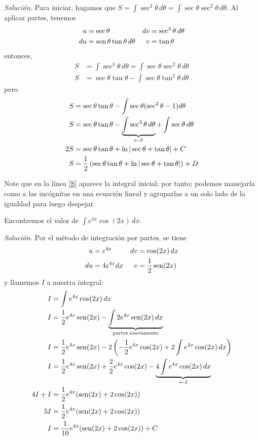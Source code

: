 \enlargethispage*{\baselineskip}

\emph{Solución.} Para iniciar, hagamos que $S=\int \sec ^{3}\theta\,d\theta=\int \sec\theta \sec^{2}\theta\,d\theta$. Al aplicar partes, tenemos
\begin{align*}
u&=\sec \theta & dv&=\sec ^{2}\theta\,d\theta\\
du&=\operatorname{sen} \theta \tan \theta\,d\theta & v&=\tan \theta
\end{align*}
entonces,
\begin{align*}
S&=\int \sec ^{3}\theta\,d\theta=\int \sec\theta \sec^{2}\theta\,d\theta\\
S&=\sec \theta \tan \theta -\int \sec \theta \tan ^{2}\theta\,d\theta
\end{align*}
pero
\begin{align}\label{S}
S&=\sec \theta \tan \theta -\int \sec \theta (\sec ^{2}\theta -1)d\theta\notag\\
S&=\sec \theta \tan \theta -\underbrace{\int \sec ^{3}\theta\,d\theta }_{\leftarrow S}+\int\sec \theta\,d\theta\\
2S&=\sec \theta \tan \theta +\ln |\sec \theta +\tan \theta |+C\notag\\
S&=\frac{1}{2}\left(\sec \theta \tan \theta +\ln |\sec \theta +\tan \theta |\right)+D\notag
\end{align}

Note que en la línea \eqref{S} aparece la integral inicial; por tanto; podemos manejarla como a las incógnitas en una ecuación lineal y agruparlas a un solo lado de la igualdad para luego despejar.

\begin{ejemplo}
Encontremos el valor de $\int e^{4x}\cos (2x)\,dx$.
\end{ejemplo}

\emph{Solución.} Por el método de integración por partes, se tiene
\begin{align*}
u&=e^{4x} & dv&=\cos (2x)\,dx \\
du&=4e^{4x}dx & v&=\frac{1}{2}\operatorname{sen} (2x)
\end{align*}
y llamemos $I$ a nuestra integral:
\begin{align}
I&=\int e^{4x}\cos (2x)\,dx\notag\\
I&=\frac{1}{2}e^{4x}\operatorname{sen} (2x)-\underbrace{\int 2e^{4x}\operatorname{sen} (2x)\,dx}_{\text{partes nuevamente}}\notag\\
I&=\frac{1}{2}e^{4x}\operatorname{sen} (2x)-2\left(-\frac{1}{2}e^{4x}\cos(2x)+2\int e^{4x}\cos (2x)\,dx \right)\notag\\
I&=\frac{1}{2}e^{4x}\operatorname{sen} (2x)+\frac{2}{2}e^{4x}\cos (2x)-\underbrace{4\int e^{4x}\cos (2x)\,dx}_{\leftarrow I}\\
4I+I&=\frac{1}{2}e^{4x}(\operatorname{sen} (2x)+2\cos (2x))\notag\\
5I&=\frac{1}{2}e^{4x}(\operatorname{sen} (2x)+2\cos (2x))\notag\\
I&=\frac{1}{10}e^{4x}(\operatorname{sen} (2x)+2\cos (2x))+C\notag
\end{align}

